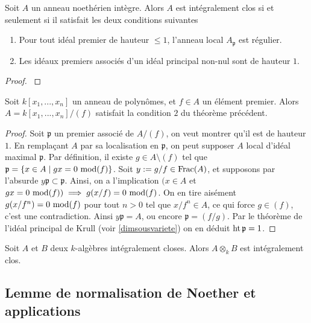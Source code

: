 \begin{thm}\label{SerreCritere}
Soit $A$ un anneau noethérien intègre. Alors $A$ est intégralement clos si et seulement si il satisfait les deux conditions suivantes
\begin{enumerate}
\item Pour tout idéal premier de hauteur $\leq 1$, l'anneau local $A_\mathfrak{p}$ est régulier.
\item Les idéaux premiers associés d'un idéal principal non-nul sont de hauteur $1$.
\end{enumerate}
\end{thm}
\begin{proof}
\cite[23.8]{Matsumura} 
\end{proof}

\begin{prop}\label{SerreCritere2}
Soit $k[x_1,...,x_n]$ un anneau de polynômes, et $f\in A$ un élément premier. Alors $A=k[x_1,...,x_n]/(f)$ satisfait la condition $2$ du théorème précédent. 
\end{prop}
\begin{proof}
Soit $\mathfrak{p}$ un premier associé de $A/(f)$, on veut montrer qu'il est de hauteur $1$. En remplaçant $A$ par sa localisation en $\mathfrak{p}$, on peut supposer $A$ local d'idéal maximal $\mathfrak{p}$. Par définition, il existe $g\in A\setminus (f) $ tel que $\mathfrak{p}=\lbrace x\in A\mid gx=0 \,\operatorname{mod} (f)\rbrace$. Soit $y:=g/f\in \operatorname{Frac}(A)$, et supposons par l'absurde $y\mathfrak{p}\subset\mathfrak{p}$. Ainsi, on a l'implication $(x\in A$ et $gx=0 \,\operatorname{mod} (f))\implies g(x/f)=0\,\operatorname{mod} (f)$. On en tire aisément $g(x/f^n)=0\,\operatorname{mod} (f)$ pour tout $n>0$ tel que $x/f^n\in A$, ce qui force $g\in (f)$, c'est une contradiction. Ainsi $y\mathfrak{p}=A$, ou encore $\mathfrak{p}=(f/g)$. Par le théorème de l'idéal principal de Krull (voir \ref{dimsousvariete}) on en déduit $\operatorname{ht} \mathfrak{p}=1$.
\end{proof}

\begin{prop}\label{tensorproductNormalDomain}
Soit $A$ et $B$ deux $k$-algèbres intégralement closes. Alors $A\otimes_k B$ est intégralement clos.
\end{prop}


\subsection{Lemme de normalisation de Noether et applications}

